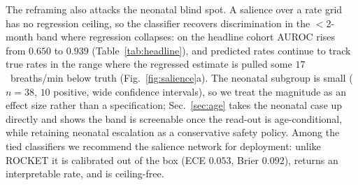 \documentclass[journal]{IEEEtran}
\begin{document}
The reframing also attacks the neonatal blind spot. A salience over a rate grid has no regression ceiling,
so the classifier recovers discrimination in the $<$2-month band where regression collapses: on the
headline cohort AUROC rises from $0.650$ to $0.939$ (Table~\ref{tab:headline}), and predicted rates
continue to track true rates in the range where the regressed estimate is pulled some $17$~breaths/min
below truth (Fig.~\ref{fig:salience}a). The neonatal subgroup is small ($n{=}38$, $10$ positive, wide
confidence intervals), so we treat the magnitude as an effect size rather than a specification; Sec.~\ref{sec:age} takes the neonatal case up directly and
shows the band is screenable once the read-out is age-conditional, while retaining neonatal escalation as
a conservative safety policy. Among the tied classifiers we
recommend the salience network for deployment: unlike ROCKET it is calibrated out of the box (ECE $0.053$,
Brier $0.092$), returns an interpretable rate, and is ceiling-free.
\end{document}
